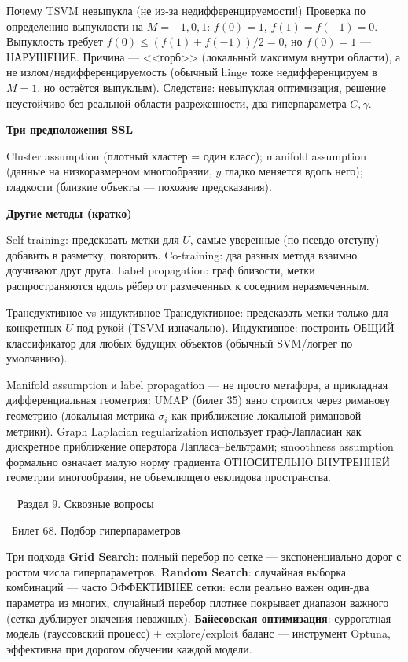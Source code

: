 \documentclass[12pt, a4paper]{article}
\newcommand{\razdel}[2]{%
  \clearpage%
  \noindent\colorbox{razdelcol}{\parbox{\dimexpr\linewidth-2\fboxsep\relax}{%
    \color{white}\LARGE\bfseries\strut\ \ Раздел #1. #2%
  }}%
  \vspace{10pt}%
}
\newcommand{\bilet}[2]{%
  \vspace{10pt}%
  \noindent\colorbox{qcolor}{\parbox{\dimexpr\linewidth-2\fboxsep\relax}{%
    \color{white}\large\bfseries\strut\ Билет #1. #2%
  }}%
  \nopagebreak\vspace{5pt}\par\nopagebreak%
}
\newcommand{\qsub}[1]{%
  \vspace{5pt}%
  {\bfseries\color{defblue} #1}%
  \par\vspace{2pt}%
}
\begin{document}
\begin{proofbox}{Почему TSVM невыпукла (не из-за недифференцируемости!)}
Проверка по определению выпуклости на $M{=}-1,0,1$: $f(0)=1$, $f(1){=}f(-1){=}0$. Выпуклость требует $f(0)\le(f(1)+f(-1))/2=0$, но $f(0)=1$ --- НАРУШЕНИЕ. Причина --- <<горб>> (локальный максимум внутри области), а не излом/недифференцируемость (обычный hinge тоже недифференцируем в $M{=}1$, но остаётся выпуклым). Следствие: невыпуклая оптимизация, решение неустойчиво без реальной области разреженности, два гиперпараметра $C,\gamma$.
\end{proofbox}

\qsub{Три предположения SSL}
Cluster assumption (плотный кластер = один класс); manifold assumption (данные на низкоразмерном многообразии, $y$ гладко меняется вдоль него); гладкости (близкие объекты --- похожие предсказания).

\qsub{Другие методы (кратко)}
Self-training: предсказать метки для $U$, самые уверенные (по псевдо-отступу) добавить в разметку, повторить. Co-training: два разных метода взаимно доучивают друг друга. Label propagation: граф близости, метки распространяются вдоль рёбер от размеченных к соседним неразмеченным.

\begin{rembox}{Трансдуктивное vs индуктивное}
Трансдуктивное: предсказать метки только для конкретных $U$ под рукой (TSVM изначально). Индуктивное: построить ОБЩИЙ классификатор для любых будущих объектов (обычный SVM/логрег по умолчанию).
\end{rembox}

\begin{fishkabox}
Manifold assumption и label propagation --- не просто метафора, а прикладная дифференциальная геометрия: UMAP (билет 35) явно строится через риманову геометрию (локальная метрика $\sigma_i$ как приближение локальной римановой метрики). Graph Laplacian regularization использует граф-Лапласиан как дискретное приближение оператора Лапласа--Бельтрами; smoothness assumption формально означает малую норму градиента ОТНОСИТЕЛЬНО ВНУТРЕННЕЙ геометрии многообразия, не объемлющего евклидова пространства.
\end{fishkabox}

\razdel{9}{Сквозные вопросы}

\bilet{68}{Подбор гиперпараметров}

\begin{defbox}{Три подхода}
\textbf{Grid Search}: полный перебор по сетке --- экспоненциально дорог с ростом числа гиперпараметров. \textbf{Random Search}: случайная выборка комбинаций --- часто ЭФФЕКТИВНЕЕ сетки: если реально важен один-два параметра из многих, случайный перебор плотнее покрывает диапазон важного (сетка дублирует значения неважных). \textbf{Байесовская оптимизация}: суррогатная модель (гауссовский процесс) + explore/exploit баланс --- инструмент Optuna, эффективна при дорогом обучении каждой модели.
\end{defbox}
\end{document}
